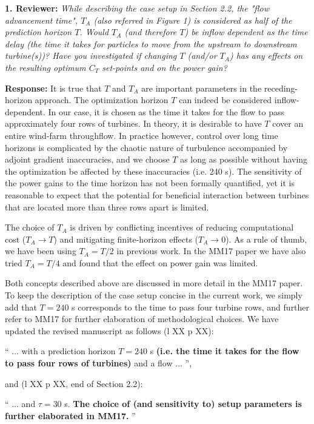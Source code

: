 \documentclass[]{article}
\begin{document}
\textbf{1. Reviewer: } \textit{While describing the case setup in Section 2.2, the "flow advancement time", $T_A$ (also
	referred in Figure 1) is considered as half of the prediction horizon $T$. Would $T_A$ (and
	therefore $T$) be inflow dependent as the time delay (the time it takes for particles to
	move from the upstream to downstream turbine(s))? Have you investigated if changing
	$T$ (and/or $T_A$) has any effects on the resulting optimum $C_T$ set-points and on the power
	gain?}

\textbf{Response: } It is true that $T$ and $T_A$ are important parameters in the receding-horizon approach. The optimization horizon $T$ can indeed be considered inflow-dependent. In our case, it is chosen as the time it takes for the flow to pass approximately four rows of turbines. In theory, it is desirable to have $T$ cover an entire wind-farm throughflow. In practice however, control over long time horizons is complicated by the chaotic nature of turbulence accompanied by adjoint gradient inaccuracies, and we choose $T$ as long as possible without having the optimization be affected by these inaccuracies (i.e. 240 s). The sensitivity of the power gains to the time horizon has not been formally quantified, yet it is reasonable to expect that the potential for beneficial interaction between turbines that are located more than three rows apart is limited. 

The choice of $T_A$ is driven by conflicting incentives of reducing computational cost ($T_A \rightarrow T$) and mitigating finite-horizon effects ($T_A \rightarrow 0$). As a rule of thumb, we have been using $T_A = T/2$ in previous work. In the MM17 paper we have also tried $T_A = T/4$ and found that the effect on power gain was limited.

Both concepts described above are discussed in more detail in the MM17 paper. To keep the description of the case setup concise in the current work, we simply add that $T = 240$ s corresponds to the time to pass four turbine rows, and further refer to MM17 for further elaboration of methodological choices. We have updated the revised manuscript as follows (l XX p XX): 

``
... with a prediction horizon $T = 240$ s \textbf{(i.e. the time it takes for the flow to pass four rows of turbines)} and a flow ...
'',

and (l XX p XX, end of Section 2.2):

`` 
... and $\tau = 30$ s. \textbf{The choice of (and sensitivity to) setup parameters is further elaborated in MM17.}
''
\end{document}
